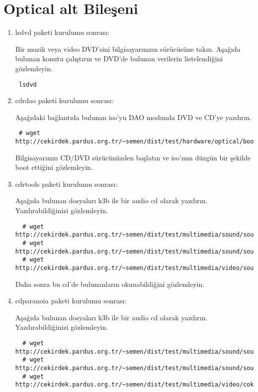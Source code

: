 \documentclass[a4paper,10pt]{article}
\begin{document}
\section{Optical alt Bileşeni}
\begin{enumerate}
\item lsdvd paketi kurulumu sonrası:

Bir muzik veya video DVD'sini bilgisayarınızın sürücüsüne takın. Aşağıda bulunan konutu çalıştırın ve DVD'de bulunan verilerin listelendiğini gözlemleyin. 
\begin{verbatim}
 lsdvd
\end{verbatim}

\item cdrdao paketi kurulumu sonrası:

Aşağıdaki bağlantıda bulunan iso'yu DAO modunda DVD ve CD'ye yazdırın. 
\begin{verbatim}
 # wget http://cekirdek.pardus.org.tr/~semen/dist/test/hardware/optical/boot.iso
\end{verbatim}

Bilgisayarınızı CD/DVD sürücünüzden başlatın ve iso'nun düzgün bir şekilde boot ettiğini gözlemleyin.


 \item cdrtools paketi kurulumu sonrası:

Aşağıda bulunan dosyaları k3b ile bir audio cd olarak yazdırın. Yazdırabildiğinizi gözlemleyin.
 \begin{verbatim}
  # wget http://cekirdek.pardus.org.tr/~semen/dist/test/multimedia/sound/sound/sample.wav
  # wget http://cekirdek.pardus.org.tr/~semen/dist/test/multimedia/sound/sound/sample.mp3
  # wget http://cekirdek.pardus.org.tr/~semen/dist/test/multimedia/video/sound/sample.ogg
 \end{verbatim}

Daha sonra bu cd'de bulunanların okunabildiğini gözlemleyin.
 \item cdparanoia paketi kurulumu sonrası:

Aşağıda bulunan dosyaları k3b ile bir audio cd olarak yazdırın. Yazdırabildiğinizi gözlemleyin.
 \begin{verbatim}
  # wget http://cekirdek.pardus.org.tr/~semen/dist/test/multimedia/sound/sound/sample.wav
  # wget http://cekirdek.pardus.org.tr/~semen/dist/test/multimedia/sound/sound/sample.mp3
  # wget http://cekirdek.pardus.org.tr/~semen/dist/test/multimedia/video/cokluortam/linux.ogg
 \end{verbatim}


\end{enumerate}
\end{document}

